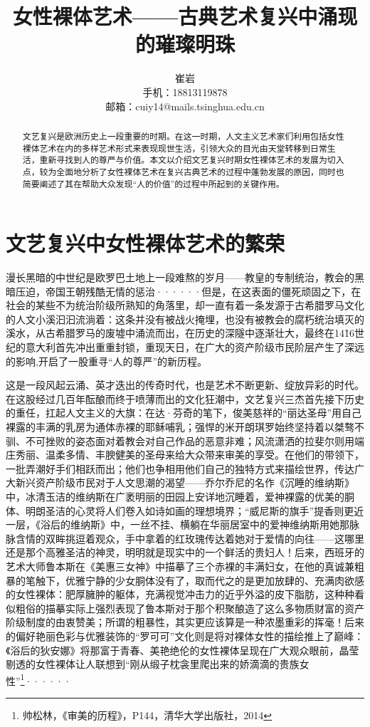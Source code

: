 \documentclass[UTF8,a4paper]{ctexart}
\title{\textbf{女性裸体艺术——古典艺术复兴中涌现的璀璨明珠}}
\date{}
\author{崔岩 \qquad \qquad 2014010785\\手机：18813119878\\邮箱：cuiy14@mails.tsinghua.edu.cn }
\begin{document}
\maketitle
\begin{abstract}
文艺复兴是欧洲历史上一段重要的时期。在这一时期，人文主义艺术家们利用包括女性裸体艺术在内的多样艺术形式来表现现世生活，引领大众的目光由天堂转移到日常生活，重新寻找到人的尊严与价值。本文以介绍文艺复兴时期女性裸体艺术的发展为切入点，较为全面地分析了女性裸体艺术在复兴古典艺术的过程中蓬勃发展的原因，同时也简要阐述了其在帮助大众发现``人的价值''的过程中所起到的关键作用。	
		
\end{abstract}

\section{文艺复兴中女性裸体艺术的繁荣}
漫长黑暗的中世纪是欧罗巴土地上一段难熬的岁月——教皇的专制统治，教会的黑暗压迫，帝国王朝残酷无情的惩治······但是，在这表面的僵死顽固之下，在社会的某些不为统治阶级所熟知的角落里，却一直有着一条发源于古希腊罗马文化的人文小溪汩汩流淌着：这条并没有被战火掩埋，也没有被教会的腐朽统治填灭的溪水，从古希腊罗马的废墟中涌流而出，在历史的深隧中逐渐壮大，最终在14\~16世纪的意大利首先冲出重重封锁，重现天日，在广大的资产阶级市民阶层产生了深远的影响,开启了一股重寻``人的尊严''的新历程。

这是一段风起云涌、英才迭出的传奇时代，也是艺术不断更新、绽放异彩的时代。在这股经过几百年酝酿而终于喷薄而出的文化狂潮中，文艺复兴三杰首先接下历史的重任，扛起人文主义的大旗：在达·芬奇的笔下，俊美慈祥的“丽达圣母”用自己裸露的丰满的乳房为通体赤裸的耶稣哺乳；强悍的米开朗琪罗始终坚持着以桀骜不驯、不可挫败的姿态面对着教会对自己作品的恶意非难；风流潇洒的拉斐尔则用端庄秀丽、温柔多情、丰腴健美的圣母来给大众带来审美的享受。在他们的带领下，一批弄潮好手们相跃而出；他们也争相用他们自己的独特方式来描绘世界，传达广大新兴资产阶级市民对于人文思潮的渴望——乔尔乔尼的名作《沉睡的维纳斯》中，冰清玉洁的维纳斯在广袤明丽的田园上安详地沉睡着，爱神裸露的优美的胴体、明朗圣洁的心灵将人们卷入如诗如画的理想境界；“威尼斯的旗手”提香则更近一层，《浴后的维纳斯》中，一丝不挂、横躺在华丽居室中的爱神维纳斯用她那脉脉含情的双眸挑逗着观众，手中拿着的红玫瑰传达着她对于爱情的向往——这哪里还是那个高雅圣洁的神灵，明明就是现实中的一个鲜活的贵妇人！后来，西班牙的艺术大师鲁本斯在《美惠三女神》中描摹了三个赤裸的丰满妇女，在他的真诚兼粗暴的笔触下，优雅宁静的少女胴体没有了，取而代之的是更加放肆的、充满肉欲感的女性裸体：肥厚臃肿的躯体，充满视觉冲击力的近乎外溢的皮下脂肪，这种种看似粗俗的描摹实际上强烈表现了鲁本斯对于那个积聚酿造了这么多物质财富的资产阶级制度的由衷赞美；所谓的粗暴性，其实更应该算是一种浓墨重彩的挥毫！后来的偏好艳丽色彩与优雅装饰的“罗可可”文化则是将对裸体女性的描绘推上了巅峰：《浴后的狄安娜》将那富于青春、美艳绝伦的女性裸体呈现在广大观众眼前，晶莹剔透的女性裸体让人联想到“刚从缎子枕衾里爬出来的娇滴滴的贵族女性”\footnote{帅松林，《审美的历程》，P144，清华大学出版社，2014 }······
\end{document}
